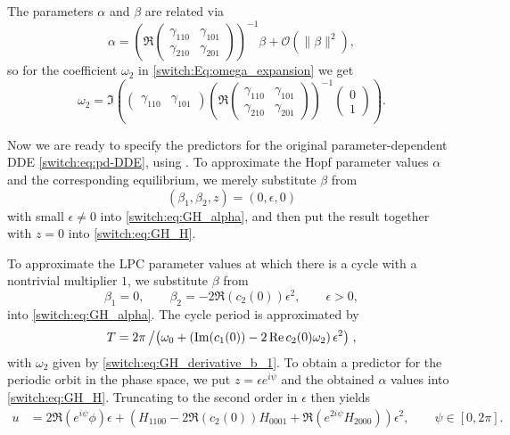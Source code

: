 The parameters $\alpha$ and $\beta$ are related via
\begin{equation}
\label{switch:eq:GH_alpha}
\alpha=\left(\Re \begin{pmatrix}
\gamma_{110} & \gamma_{101}\\
\gamma_{210} & \gamma_{201}
\end{pmatrix}\right)^{-1}\beta + {\mathcal O}(\|\beta\|^2),
\end{equation}
so for the coefficient $\omega_2$ in \cref{switch:Eq:omega_expansion} we get
\begin{equation}
\label{switch:eq:GH_derivative_b_1}
\omega_2=\Im\left(
\begin{pmatrix}
  \gamma_{110} & \gamma_{101}
\end{pmatrix}
\left(\Re
  \begin{pmatrix}
\gamma_{110} & \gamma_{101}\\
\gamma_{210} & \gamma_{201}
\end{pmatrix}
\right)^{-1}
\begin{pmatrix}
0\\
1
\end{pmatrix}
\right).
\end{equation}

Now we are ready to specify the predictors for the original parameter-dependent DDE \cref{switch:eq:pd-DDE}, using \cite{Kuznetsov2008}. To approximate the Hopf parameter values $\alpha$ and the corresponding equilibrium, we  merely substitute $\beta$ from 
\begin{equation}
\label{switch:eq:GH_approximation_Hopf}
(\beta_{1},\beta_{2},z)=(0,\epsilon,0)
\end{equation}
with small $\epsilon\neq0$ into \cref{switch:eq:GH_alpha}, and then put the result together with $z=0$ into \cref{switch:eq:GH_H}.

To approximate the LPC parameter values at which there is a cycle with a nontrivial multiplier $1$, we substitute $\beta$ from
\begin{equation}
\label{switch:eq:GH_approximation_LPC}
\beta_{1}=0,\qquad\beta_{2}=-2 \Re(c_{2}(0)) \epsilon^{2}, \qquad  \epsilon>0,
\end{equation}
into \cref{switch:eq:GH_alpha}. The cycle period is approximated by 
\begin{equation}
\label{switch:eq:GH_approximation_LPC_T}
T = 2\pi\left/\left(\omega_0+\left(\Im(c_{1}(0))-2\Re c_2(0) \omega_{2} \right)\epsilon^{2} \right) \right.,
\end{equation}
with $\omega_2$ given by \cref{switch:eq:GH_derivative_b_1}. 
To obtain a predictor for the periodic orbit in the phase space, we put
$z=\epsilon e^{i\psi}$ and the obtained $\alpha$ values into \cref{switch:eq:GH_H}. Truncating to the second order in $\epsilon$ then yields
\begin{align*}
u & =2\Re(e^{i\psi}\phi)\epsilon+\left(H_{1100}-2\Re(c_{2}(0))H_{0001}+\Re(e^{2i\psi}H_{2000})\right)\epsilon^{2}, \qquad \psi\in[0,2\pi].
\end{align*}

